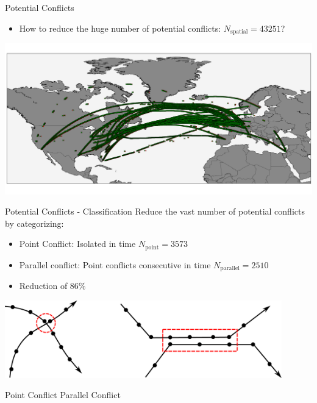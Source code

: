 \documentclass[10pt]{beamer}
\begin{document}
\begin{frame}[t]{Potential Conflicts}
    \begin{itemize}
        \item How to reduce the huge number of potential conflicts: $N_\text{spatial} = 43251$?
    \end{itemize}
    \includegraphics[width=1.0\textwidth]{images/spatial_conflicts_data.png}
\end{frame}
\begin{frame}[t]{Potential Conflicts - Classification}
    Reduce the vast number of potential conflicts by categorizing:
    \begin{itemize}
        \item Point Conflict: Isolated in time $N_\text{point} = 3573$
        \item Parallel conflict: Point conflicts consecutive in time $N_\text{parallel} = 2510$
        \item Reduction of $86 \%$
    \end{itemize}
    \begin{center}
        \includegraphics[width=0.9\textwidth]{images/spatial_conflict_categories.pdf}
    \end{center}
    \hspace{1.0cm}
    Point Conflict
    \hspace{3.5cm}
    Parallel Conflict
\end{frame}
\end{document}
